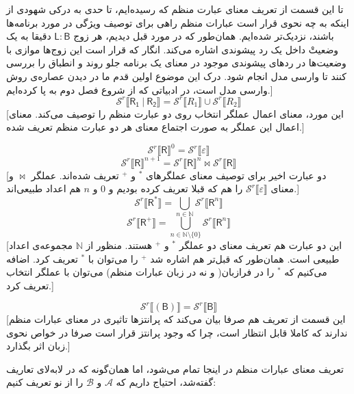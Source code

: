 \begin{defn}
تا این قسمت از تعریف معنای عبارت منظم که رسیده‌ایم، تا حدی به درکی شهودی از اینکه به چه نحوی قرار است عبارات منظم راهی برای توصیف ویژگی‌ در مورد برنامه‌ها باشند، نزدیک‌تر شده‌ایم. همان‌طور که در مورد قبل دیدیم، هر زوج 
$\mathsf{L:B}$
دقیقا به یک وضعیتْ داخل یک رد پیشوندی اشاره می‌کند. انگار که قرار است این زوج‌ها موازی با وضعیت‌ها در ردهای پیشوندی موجود در معنای یک برنامه جلو روند و انطباق را بررسی کنند تا وارسی مدل انجام شود. درک این موضوع اولین قدم ما در دیدن عصاره‌ی روش وارسی مدل است، در ادبیاتی که از شروع فصل دوم به پا کرده‌ایم.]
$$\mathcal{S}^r \llbracket\mathsf{R_1\:|\:R_2}\rrbracket= 
\mathcal{S}^r \llbracket R_1\rrbracket \cup
\mathcal{S}^r \llbracket R_2\rrbracket$$
[این مورد، معنای اعمال عملگر انتخاب روی دو عبارت منظم را توصیف می‌کند. معنای اعمال این عملگر به صورت اجتماع معنای هر دو عبارت منظم تعریف شده.]

$$\mathcal{S}^r \llbracket\mathsf{R}\rrbracket^0 = \mathcal{S}^r\llbracket\varepsilon\rrbracket$$
$$\mathcal{S}^r \llbracket\mathsf{R}\rrbracket^{n+1} = \mathcal{S}^r \llbracket\mathsf{R}\rrbracket^{n} \Join
\mathcal{S}^r \llbracket\mathsf{R}\rrbracket$$
[دو عبارت اخیر برای توصیف معنای عملگرهای $^*$ و $^+$ تعریف شده‌اند. عملگر $\Join$ و معنای 
$\mathcal{S}^r\llbracket\varepsilon\rrbracket$
را هم که قبلا تعریف کرده بودیم و $0$ و $n$ هم اعداد طبیعی‌اند.]
$$\mathcal{S}^r\llbracket\mathsf{R^*}\rrbracket =  \bigcup_{n \in \mathbb{N}}
\mathcal{S}^r \llbracket\mathsf{R}^n\rrbracket$$
$$\mathcal{S}^r\llbracket\mathsf{R^+}\rrbracket =  \bigcup_{n \in \mathbb{N}\setminus\{0\}}
\mathcal{S}^r \llbracket\mathsf{R}^n\rrbracket$$
[این دو عبارت هم تعریف معنای دو عملگر $^*$ و $^+$ هستند. منظور از $\mathbb{N}$ مجموعه‌ی اعداد طبیعی است. همان‌طور که قبل‌تر هم اشاره شد $^+$ را می‌توان با $^*$ تعریف کرد. اضافه می‌کنیم که $^*$ را در فرازبان( و نه در زبان عبارات منظم) می‌توان با عملگر انتخاب تعریف کرد.]

$$\mathcal{S}^r \llbracket(\mathsf{B})\rrbracket=\mathcal{S}^r \llbracket\mathsf{B}\rrbracket$$
[این قسمت از تعریف هم صرفا بیان می‌کند که پرانتزها تاثیری در معنای عبارات منظم ندارند که کاملا قابل انتظار است، چرا که وجود پرانتز قرار است صرفا در خواص نحوی زبان اثر بگذارد.]
\end{defn}
تعریف معنای عبارات منظم در اینجا تمام می‌شود، اما همان‌گونه که در لا‌به‌لای تعاریف گفته‌شد، احتیاج داریم که $\mathcal{A}$ و $\mathcal{B}$ را از نو تعریف کنیم:
